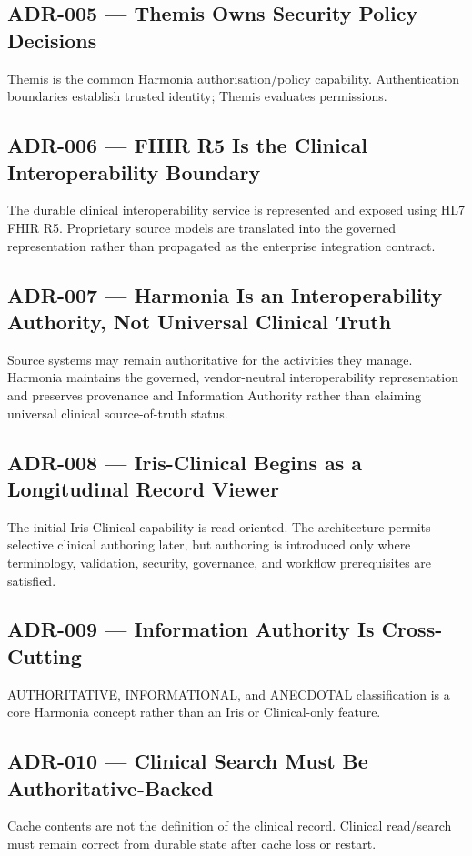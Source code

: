 \subsection{ADR-005 --- Themis Owns Security Policy Decisions}
Themis is the common Harmonia authorisation/policy capability. Authentication boundaries establish trusted identity; Themis evaluates permissions.

\subsection{ADR-006 --- FHIR R5 Is the Clinical Interoperability Boundary}
The durable clinical interoperability service is represented and exposed using HL7 FHIR R5. Proprietary source models are translated into the governed representation rather than propagated as the enterprise integration contract.

\subsection{ADR-007 --- Harmonia Is an Interoperability Authority, Not Universal Clinical Truth}
Source systems may remain authoritative for the activities they manage. Harmonia maintains the governed, vendor-neutral interoperability representation and preserves provenance and Information Authority rather than claiming universal clinical source-of-truth status.

\subsection{ADR-008 --- Iris-Clinical Begins as a Longitudinal Record Viewer}
The initial Iris-Clinical capability is read-oriented. The architecture permits selective clinical authoring later, but authoring is introduced only where terminology, validation, security, governance, and workflow prerequisites are satisfied.

\subsection{ADR-009 --- Information Authority Is Cross-Cutting}
AUTHORITATIVE, INFORMATIONAL, and ANECDOTAL classification is a core Harmonia concept rather than an Iris or Clinical-only feature.

\subsection{ADR-010 --- Clinical Search Must Be Authoritative-Backed}
Cache contents are not the definition of the clinical record. Clinical read/search must remain correct from durable state after cache loss or restart.

